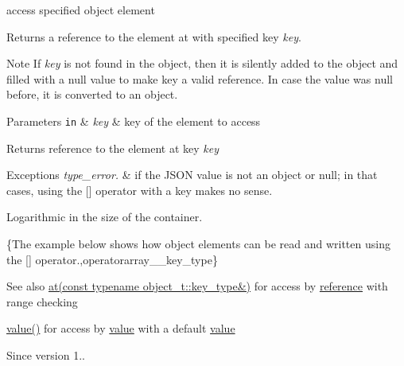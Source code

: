 access specified object element 

Returns a reference to the element at with specified key {\itshape key}.

\begin{DoxyNote}{Note}
If {\itshape key} is not found in the object, then it is silently added to the object and filled with a {\ttfamily null} value to make {\ttfamily key} a valid reference. In case the value was {\ttfamily null} before, it is converted to an object.
\end{DoxyNote}

\begin{DoxyParams}[1]{Parameters}
\mbox{\tt in}  & {\em key} & key of the element to access\\
\hline
\end{DoxyParams}
\begin{DoxyReturn}{Returns}
reference to the element at key {\itshape key} 
\end{DoxyReturn}

\begin{DoxyExceptions}{Exceptions}
{\em type\+\_\+error.} & if the J\+S\+ON value is not an object or null; in that cases, using the \mbox{[}\mbox{]} operator with a key makes no sense.\\
\hline
\end{DoxyExceptions}
Logarithmic in the size of the container.

\{The example below shows how object elements can be read and written using the {\ttfamily \mbox{[}\mbox{]}} operator.,operatorarray\+\_\+\+\_\+key\+\_\+type\}

\begin{DoxySeeAlso}{See also}
\hyperlink{classnlohmann_1_1basic__json_a239e942da82f2597d0cf5ec806f5bc0d}{at(const typename object\+\_\+t\+::key\+\_\+type\&)} for access by \hyperlink{classnlohmann_1_1basic__json_a220ae98554a76205fb7f8822d36b2d5a}{reference} with range checking 

\hyperlink{classnlohmann_1_1basic__json_ac9e014095170d72c4c57e3daf8efc059}{value()} for access by \hyperlink{classnlohmann_1_1basic__json_ac9e014095170d72c4c57e3daf8efc059}{value} with a default \hyperlink{classnlohmann_1_1basic__json_ac9e014095170d72c4c57e3daf8efc059}{value}
\end{DoxySeeAlso}
\begin{DoxySince}{Since}
version 1.. 
\end{DoxySince}
